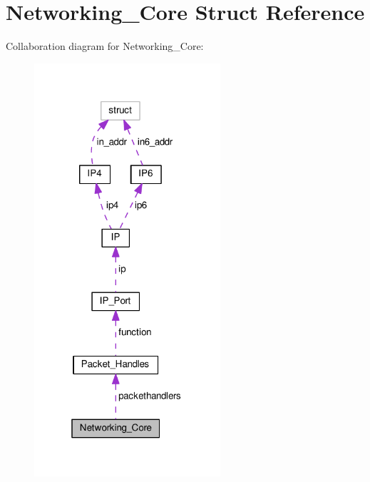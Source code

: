 \hypertarget{struct_networking___core}{\section{Networking\+\_\+\+Core Struct Reference}
\label{struct_networking___core}
}


Collaboration diagram for Networking\+\_\+\+Core\+:
\nopagebreak
\begin{figure}[H]
\begin{center}
\leavevmode
\includegraphics[width=196pt]{struct_networking___core__coll__graph}
\end{center}
\end{figure}
